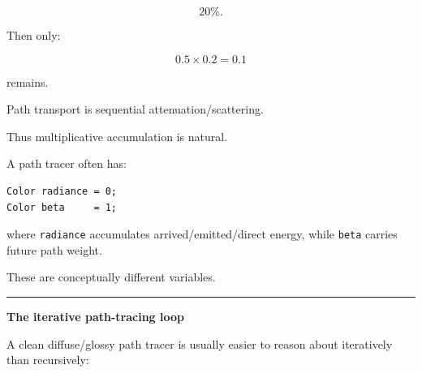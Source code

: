 \[
20\%.
\]

Then only:

\[
0.5\times0.2=0.1
\]

remains.

Path transport is sequential attenuation/scattering.

Thus multiplicative accumulation is natural.

A path tracer often has:

\begin{verbatim}
Color radiance = 0;
Color beta     = 1;
\end{verbatim}

where \texttt{radiance} accumulates arrived/emitted/direct energy, while \texttt{beta} carries future path weight.

These are conceptually different variables.

\begin{center}\rule{0.5\linewidth}{0.5pt}\end{center}

\textbf{The iterative path-tracing loop}

A clean diffuse/glossy path tracer is usually easier to reason about iteratively than recursively:


